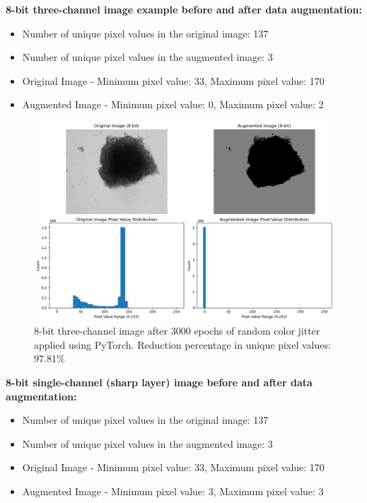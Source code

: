 \documentclass[12pt,twoside,a4paper,parskip]{scrbook} %
\begin{document}
\textbf{8-bit three-channel image example before and after data augmentation:}
\begin{itemize}
  \item Number of unique pixel values in the original image: 137
  \item Number of unique pixel values in the augmented image: 3
  \item Original Image - Minimum pixel value: 33, Maximum pixel value: 170
  \item Augmented Image - Minimum pixel value: 0, Maximum pixel value: 2
\end{itemize}
\begin{figure}[H]
  \centering
  \includegraphics[scale=0.5]{figures/8bit_nThree.png} 
  \caption{8-bit three-channel image after 3000 epochs of random color jitter applied using PyTorch. Reduction percentage in unique pixel values: 97.81\%}
  \label{fig:8bit_nThree}
\end{figure}

\textbf{8-bit single-channel (sharp layer) image before and after data augmentation:}

\begin{itemize}
  \item Number of unique pixel values in the original image: 137
  \item Number of unique pixel values in the augmented image: 3
  \item Original Image - Minimum pixel value: 33, Maximum pixel value: 170
  \item Augmented Image - Minimum pixel value: 3, Maximum pixel value: 3
\end{itemize}
\end{document}

